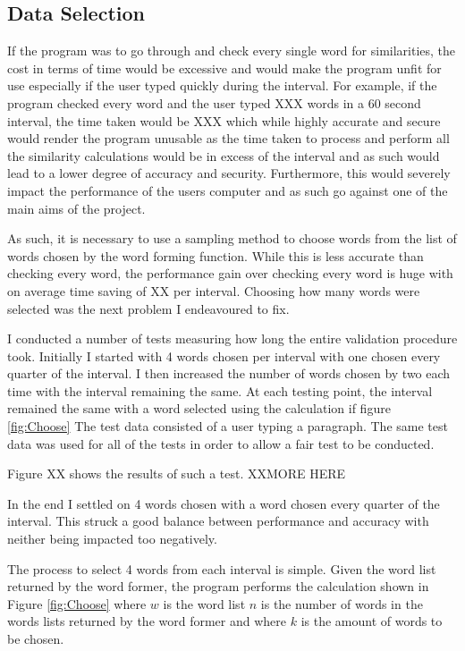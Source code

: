 \documentclass[10pt,a4paper]{report}
\begin{document}
\subsection{Data Selection}

If the program was to go through and check every single word for similarities, the cost in terms of time would be excessive and would make the program unfit for use especially if the user typed quickly during the interval. For example, if the program checked every word and the user typed XXX words in a 60 second interval, the time taken would be XXX which while highly accurate and secure would render the program unusable as the time taken to process and perform all the similarity calculations would be in excess of the interval and as such would lead to a lower degree of accuracy and security. Furthermore, this would severely impact the performance of the users computer and as such go against one of the main aims of the project.

As such, it is necessary to use a sampling method to choose words from the list of words chosen by the word forming function. While this is less accurate than checking every word, the performance gain over checking every word is huge with on average time saving of XX per interval. Choosing how many words were selected was the next problem I endeavoured to fix.

I conducted a number of tests measuring how long the entire validation procedure took. Initially I started with 4 words chosen per interval with one chosen every quarter of the interval. I then increased the number of words chosen by two each time with the interval remaining the same. At each testing point, the interval remained the same with a word selected using the calculation if figure \ref{fig:Choose} The test data consisted of a user typing a paragraph. The same test data was used for all of the tests in order to allow a fair test to be conducted.

Figure XX shows the results of such a test. XXMORE HERE

In the end I settled on 4 words chosen with a word chosen every quarter of the interval. This struck a good balance between performance and accuracy with neither being impacted too negatively.

The process to select 4 words from each interval is simple. Given the word list returned by the word former, the program performs the calculation shown in Figure \ref{fig:Choose} where \(w\) is the word list \(n\) is the number of words in the words lists returned by the word former and where \(k\) is the amount of words to be chosen.
\end{document}
